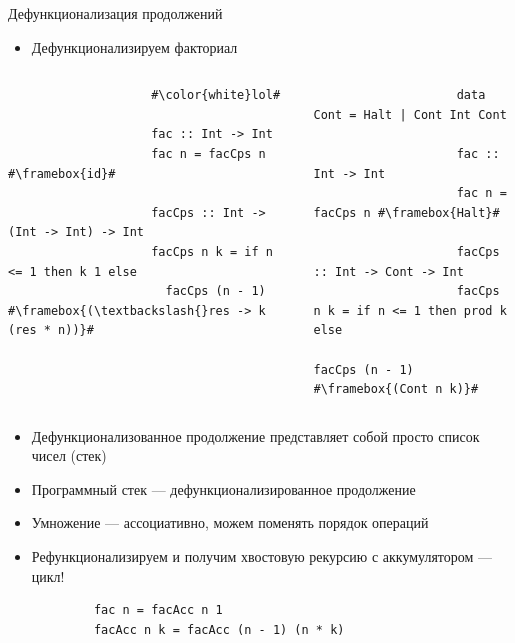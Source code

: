     \begin{frame}[fragile]{Дефункционализация продолжений}
        \begin{itemize}
            \item Дефункционализируем факториал
        \end{itemize}
        \vspace{-3em}
        \begin{columns}[onlytextwidth]
            \begin{column}[t]{0.485\textwidth}
                \begin{verbatim}
                    #\color{white}lol#

                    fac :: Int -> Int
                    fac n = facCps n #\framebox{id}#

                    facCps :: Int -> (Int -> Int) -> Int
                    facCps n k = if n <= 1 then k 1 else
                      facCps (n - 1) #\framebox{(\textbackslash{}res -> k (res * n))}#
                \end{verbatim}
            \end{column}\hfill%
            \begin{column}[t]{0.485\textwidth}
                \begin{verbatim}
                    data Cont = Halt | Cont Int Cont

                    fac :: Int -> Int
                    fac n = facCps n #\framebox{Halt}#

                    facCps :: Int -> Cont -> Int
                    facCps n k = if n <= 1 then prod k else
                      facCps (n - 1) #\framebox{(Cont n k)}#
                \end{verbatim}
            \end{column}
        \end{columns}
        \vspace{1em}
        \begin{itemize}
            \item \pause Дефункционализованное продолжение представляет собой просто список чисел (стек)
            \item Программный стек --- дефункционализированное продолжение
            \item \pause Умножение --- ассоциативно, можем поменять порядок операций
            \item Рефункционализируем и получим хвостовую рекурсию с аккумулятором --- цикл!
        \end{itemize}
        \vspace{0.5em}
        \begin{verbatim}
            fac n = facAcc n 1
            facAcc n k = facAcc (n - 1) (n * k)
        \end{verbatim}
    \end{frame}

